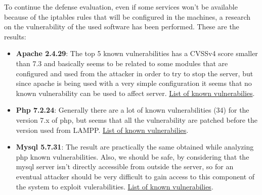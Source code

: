 \documentclass[14pt]{article}
\begin{document}
To continue the defense evaluation, even if some services won't be available because of the iptables rules that will be configured in the machines, a research on the vulnerability of the used software has been performed. These are the results:
\begin{itemize}
	\item \textbf{Apache 2.4.29}: The top 5 known vulnerabilities has a CVSSv4 score smaller than 7.3 and basically seems to be related to some modules that are configured and used from the attacker in order to try to stop the server, but since apache is being used with a very simple configuration it seems that no known vulnerability can be used to affect server. \href{https://www.cvedetails.com/vulnerability-list.php?vendor_id=45&product_id=66&version_id=241078&page=1&hasexp=0&opdos=0&opec=0&opov=0&opcsrf=0&opgpriv=0&opsqli=0&opxss=0&opdirt=0&opmemc=0&ophttprs=0&opbyp=0&opfileinc=0&opginf=0&cvssscoremin=0&cvssscoremax=0&year=0&month=0&cweid=0&order=3&trc=18&sha=e3f39e55231940b8282f47396e556881d5954cd3}{List of known vulnerabilies}.
	
	\item \textbf{Php 7.2.24}: Generally there are a lot of known vulnerabilities (34) for the version 7.x of php, but seems that all the vulnerability are patched before the version used from LAMPP. \href{https://www.cvedetails.com/vulnerability-list.php?vendor_id=74&product_id=128&version_id=235668&page=1&hasexp=0&opdos=0&opec=0&opov=0&opcsrf=0&opgpriv=0&opsqli=0&opxss=0&opdirt=0&opmemc=0&ophttprs=0&opbyp=0&opfileinc=0&opginf=0&cvssscoremin=0&cvssscoremax=0&year=0&month=0&cweid=0&order=3&trc=34&sha=2f75abb453af67c2cfdd59ab77666b9572304c78}{List of known vulnerabilies}.
	
	\item \textbf{Mysql 5.7.31}: The result are practically the same obtained while analyzing php known vulnerabilities. Also, we should be safe, by considering that the mysql server isn't directly accessible from outside the server, so for an eventual attacker should be very difficult to gain access to this component of the system to exploit vulerabilities. \href{https://www.cvedetails.com/vulnerability-list.php?vendor_id=93&product_id=21801&version_id=242149&page=1&hasexp=0&opdos=0&opec=0&opov=0&opcsrf=0&opgpriv=0&opsqli=0&opxss=0&opdirt=0&opmemc=0&ophttprs=0&opbyp=0&opfileinc=0&opginf=0&cvssscoremin=0&cvssscoremax=0&year=0&month=0&cweid=0&order=3&trc=100&sha=620313f8a90c589726af95aa0b4d06477f2a7496
	}{List of known vulnerabilies}.
\end{itemize}
\end{document}
